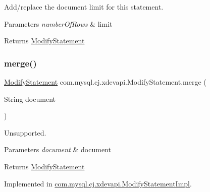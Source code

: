 Add/replace the document limit for this statement.


\begin{DoxyParams}{Parameters}
{\em number\+Of\+Rows} & limit \\
\hline
\end{DoxyParams}
\begin{DoxyReturn}{Returns}
\mbox{\hyperlink{interfacecom_1_1mysql_1_1cj_1_1xdevapi_1_1_modify_statement}{Modify\+Statement}} 
\end{DoxyReturn}
\mbox{\label{interfacecom_1_1mysql_1_1cj_1_1xdevapi_1_1_modify_statement_a479a30f18124563becbdb944587a35a1}} 
\subsubsection{\texorpdfstring{merge()}{merge()}}
{\footnotesize\ttfamily \mbox{\hyperlink{interfacecom_1_1mysql_1_1cj_1_1xdevapi_1_1_modify_statement}{Modify\+Statement}} com.\+mysql.\+cj.\+xdevapi.\+Modify\+Statement.\+merge (\begin{DoxyParamCaption}\item[{String}]{document }\end{DoxyParamCaption})}

Unsupported.


\begin{DoxyParams}{Parameters}
{\em document} & document \\
\hline
\end{DoxyParams}
\begin{DoxyReturn}{Returns}
\mbox{\hyperlink{interfacecom_1_1mysql_1_1cj_1_1xdevapi_1_1_modify_statement}{Modify\+Statement}} 
\end{DoxyReturn}


Implemented in \mbox{\hyperlink{classcom_1_1mysql_1_1cj_1_1xdevapi_1_1_modify_statement_impl_acd828dfa9665ae9290662791d1e0da96}{com.\+mysql.\+cj.\+xdevapi.\+Modify\+Statement\+Impl}}.

\mbox{\label{interfacecom_1_1mysql_1_1cj_1_1xdevapi_1_1_modify_statement_adb4e6de8bc815f50dc9ee5241454786c}} 
